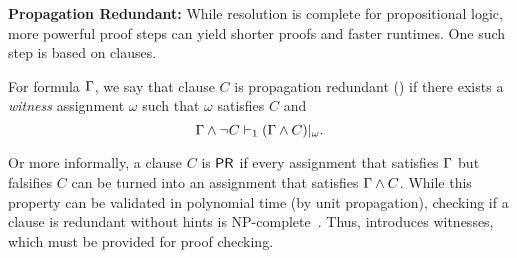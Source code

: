
\textbf{Propagation Redundant:} While resolution is complete for propositional
logic, more powerful proof steps can yield shorter proofs and faster runtimes.
One such step is based on \pr clauses.

\begin{definition}
    For formula $\Gamma$, we say that clause $C$ is propagation redundant
    (\pr) if there exists a \emph{witness} assignment $\omega$ such that
    $\omega$ satisfies $C$ and
$$
    \Gamma \land \lnot C \vdash_1 (\Gamma \land C)|_\omega.
$$
\end{definition}


   Or more informally, a clause $C$ is $\textsf{PR}$ if every assignment that satisfies
   $\Gamma$ but falsifies $C$ can be turned into an assignment that satisfies
   $\Gamma \land C$. While this property can be validated in polynomial time
   (by unit propagation), checking if a clause is redundant
   without hints is NP-complete~\cite{prclauses}. Thus, \pr introduces witnesses,
   which must be provided for proof checking.  






